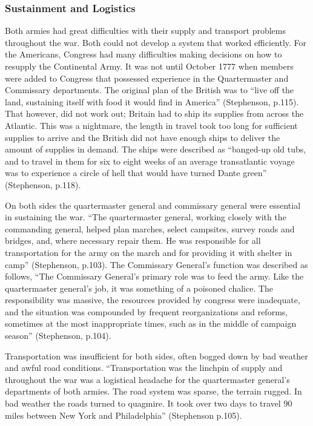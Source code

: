 \subsubsection{Sustainment and Logistics}


Both armies had great difficulties with their supply and transport problems
throughout the war.  Both could not develop a system that worked efficiently.
For the Americans, Congress had many difficulties making decisions on how to
resupply the Continental Army.  It was not until October 1777 when members were
added to Congress that possessed experience in the Quartermaster and Commissary
departments.  The original plan of the British was to “live off the land,
sustaining itself with food it would find in America” (Stephenson, p.115).  That
however, did not work out; Britain had to ship its supplies from across the
Atlantic.  This was a nightmare, the length in travel took too long for
sufficient supplies to arrive and the British did not have enough ships to
deliver the amount of supplies in demand.  The ships were described as
“banged-up old tubs, and to travel in them for six to eight weeks of an average
transatlantic voyage was to experience a circle of hell that would have turned
Dante green” (Stephenson, p.118).     

On both sides the quartermaster general and commissary general were essential in
sustaining the war.  “The quartermaster general, working closely with the
commanding general, helped plan marches, select campsites, survey roads and
bridges, and, where necessary repair them.  He was responsible for all
transportation for the army on the march and for providing it with shelter in
camp” (Stephenson, p.103).  The Commissary General’s function was described as
follows,  “The Commissary General’s primary role was to feed the army.  Like the
quartermaster general’s job, it was something of a poisoned chalice.  The
responsibility was massive, the resources provided by congress were inadequate,
and the situation was compounded by frequent reorganizations and reforms,
sometimes at the most inappropriate times, such as in the middle of campaign
season” (Stephenson, p.104).  

Transportation was insufficient for both sides, often bogged down by bad weather
and awful road conditions.  “Transportation was the linchpin of supply and
throughout the war was a logistical headache for the quartermaster general’s
departments of both armies.  The road system was sparse, the terrain rugged.  In
bad weather the roads turned to quagmire.  It took over two days to travel 90
miles between New York and Philadelphia” (Stephenson p.105).

